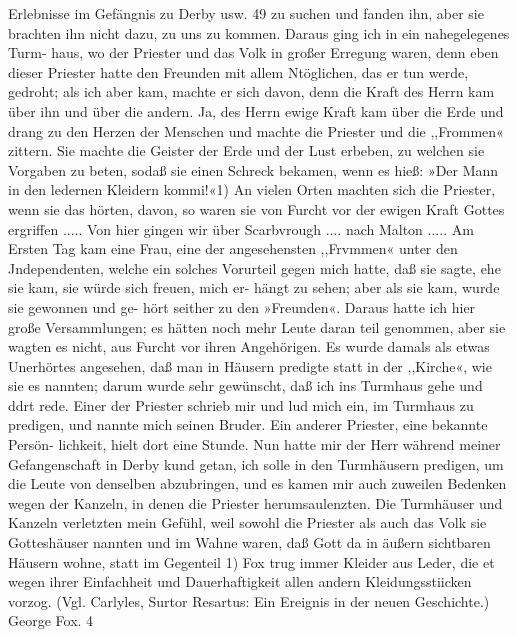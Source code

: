 Erlebnisse im Gefängnis zu Derby usw. 49
zu suchen und fanden ihn, aber sie brachten ihn nicht dazu, zu
uns zu kommen. Daraus ging ich in ein nahegelegenes Turm-
haus, wo der Priester und das Volk in großer Erregung waren,
denn eben dieser Priester hatte den Freunden mit allem Ntöglichen,
das er tun werde, gedroht; als ich aber kam, machte er sich davon,
denn die Kraft des Herrn kam über ihn und über die andern.
Ja, des Herrn ewige Kraft kam über die Erde und drang zu
den Herzen der Menschen und machte die Priester und die
,,Frommen« zittern. Sie machte die Geister der Erde und der
Lust erbeben, zu welchen sie Vorgaben zu beten, sodaß sie einen
Schreck bekamen, wenn es hieß: »Der Mann in den ledernen
Kleidern kommi!«1) An vielen Orten machten sich die Priester,
wenn sie das hörten, davon, so waren sie von Furcht vor der
ewigen Kraft Gottes ergriffen .....
Von hier gingen wir über Scarbvrough .... nach Malton .....
Am Ersten Tag kam eine Frau, eine der angesehensten ,,Frvmmen«
unter den Jndependenten, welche ein solches Vorurteil gegen mich
hatte, daß sie sagte, ehe sie kam, sie würde sich freuen, mich er-
hängt zu sehen; aber als sie kam, wurde sie gewonnen und ge-
hört seither zu den »Freunden«.
Daraus hatte ich hier große Versammlungen; es hätten noch
mehr Leute daran teil genommen, aber sie wagten es nicht, aus
Furcht vor ihren Angehörigen. Es wurde damals als etwas
Unerhörtes angesehen, daß man in Häusern predigte statt in der
,,Kirche«, wie sie es nannten; darum wurde sehr gewünscht, daß
ich ins Turmhaus gehe und ddrt rede. Einer der Priester schrieb
mir und lud mich ein, im Turmhaus zu predigen, und nannte
mich seinen Bruder. Ein anderer Priester, eine bekannte Persön-
lichkeit, hielt dort eine Stunde. Nun hatte mir der Herr während
meiner Gefangenschaft in Derby kund getan, ich solle in den
Turmhäusern predigen, um die Leute von denselben abzubringen,
und es kamen mir auch zuweilen Bedenken wegen der Kanzeln,
in denen die Priester herumsaulenzten. Die Turmhäuser und
Kanzeln verletzten mein Gefühl, weil sowohl die Priester als auch
das Volk sie Gotteshäuser nannten und im Wahne waren, daß
Gott da in äußern sichtbaren Häusern wohne, statt im Gegenteil
1) Fox trug immer Kleider aus Leder, die et wegen ihrer Einfachheit und
Dauerhaftigkeit allen andern Kleidungsstiicken vorzog. (Vgl. Carlyles, Surtor
Resartus: Ein Ereignis in der neuen Geschichte.)
George Fox. 4


